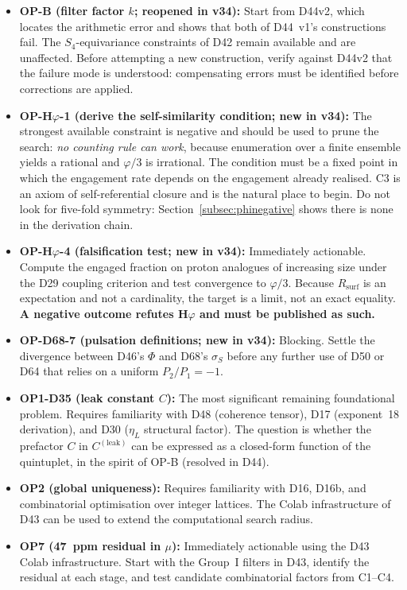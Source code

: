 \documentclass[11pt,a4paper]{article}
\theoremstyle{plain}
\theoremstyle{definition}
\theoremstyle{remark}
\newcommand{\Rsurf}{R_{\mathrm{surf}}}
\begin{document}
\begin{itemize}
\item \textbf{OP-B (filter factor $k$; reopened in v34):} Start from D44v2, which locates the arithmetic error and shows that both of D44~v1's constructions fail. The $S_4$-equivariance constraints of D42 remain available and are unaffected. Before attempting a new construction, verify against D44v2 that the failure mode is understood: compensating errors must be identified before corrections are applied.
\item \textbf{OP-H$\varphi$-1 (derive the self-similarity condition; new in v34):} The strongest available constraint is negative and should be used to prune the search: \emph{no counting rule can work}, because enumeration over a finite ensemble yields a rational and $\varphi/3$ is irrational. The condition must be a fixed point in which the engagement rate depends on the engagement already realised. C3 is an axiom of self-referential closure and is the natural place to begin. Do not look for five-fold symmetry: Section~\ref{subsec:phinegative} shows there is none in the derivation chain.
\item \textbf{OP-H$\varphi$-4 (falsification test; new in v34):} Immediately actionable. Compute the engaged fraction on proton analogues of increasing size under the D29 coupling criterion and test convergence to $\varphi/3$. Because $\Rsurf$ is an expectation and not a cardinality, the target is a limit, not an exact equality. \textbf{A negative outcome refutes H$\varphi$ and must be published as such.}
\item \textbf{OP-D68-7 (pulsation definitions; new in v34):} Blocking. Settle the divergence between D46's $\Phi$ and D68's $\sigma_S$ before any further use of D50 or D64 that relies on a uniform $P_2/P_1=-1$.
\item \textbf{OP1-D35 (leak constant $C$):} The most significant remaining foundational problem. Requires familiarity with D48 (coherence tensor), D17 (exponent~18 derivation), and D30 ($\eta_L$ structural factor). The question is whether the prefactor $C$ in $C^{(\mathrm{leak})}$ can be expressed as a closed-form function of the quintuplet, in the spirit of OP-B (resolved in D44).
\item \textbf{OP2 (global uniqueness):} Requires familiarity with D16, D16b, and combinatorial optimisation over integer lattices. The Colab infrastructure of D43 can be used to extend the computational search radius.
\item \textbf{OP7 (47~ppm residual in $\mu$):} Immediately actionable using the D43 Colab infrastructure. Start with the Group~I filters in D43, identify the residual at each stage, and test candidate combinatorial factors from C1--C4.

\end{itemize}
\end{document}
